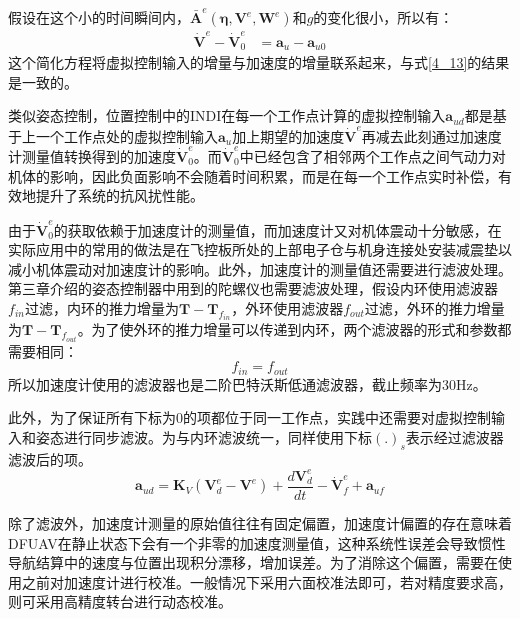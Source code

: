 假设在这个小的时间瞬间内，$\bar{\boldsymbol{A}}^e(\boldsymbol{\eta},\boldsymbol{V}^e,\boldsymbol{W}^e)$和$g$的变化很小，所以有：
\begin{equation}
    \begin{aligned}
        \dot{\boldsymbol{V}}^e - \dot{\boldsymbol{V}}^e_0&=\boldsymbol{a}_u - \boldsymbol{a}_{u0}
    \end{aligned}
    \label{4_20}
\end{equation}
这个简化方程将虚拟控制输入的增量与加速度的增量联系起来，与式\eqref{4_13}的结果是一致的。

类似姿态控制，位置控制中的INDI在每一个工作点计算的虚拟控制输入$\boldsymbol{a}_{ud}$都是基于上一个工作点处的虚拟控制输入$\boldsymbol{a}_{u}$加上期望的加速度$\boldsymbol{\dot{V}}^e$再减去此刻通过加速度计测量值转换得到的加速度$\boldsymbol{\dot{V}}^e_0$。而$\boldsymbol{\dot{V}}^e_0$中已经包含了相邻两个工作点之间气动力对机体的影响，因此负面影响不会随着时间积累，而是在每一个工作点实时补偿，有效地提升了系统的抗风扰性能。

由于$\dot{\boldsymbol{V}}^e_0$的获取依赖于加速度计的测量值，而加速度计又对机体震动十分敏感，在实际应用中的常用的做法是在飞控板所处的上部电子仓与机身连接处安装减震垫以减小机体震动对加速度计的影响。此外，加速度计的测量值还需要进行滤波处理。第三章介绍的姿态控制器中用到的陀螺仪也需要滤波处理，假设内环使用滤波器$f_{in}$过滤，内环的推力增量为$\boldsymbol{T}-\boldsymbol{T}_{f_{in}}$，外环使用滤波器$f_{out}$过滤，外环的推力增量为$\boldsymbol{T}-\boldsymbol{T}_{f_{out}}$。为了使外环的推力增量可以传递到内环，两个滤波器的形式和参数都需要相同\cite{smeurCascadedIncrementalNonlinear2018b}：
\begin{equation}
        f_{in}=f_{out}
    \label{4_21}
\end{equation}
所以加速度计使用的滤波器也是二阶巴特沃斯低通滤波器，截止频率为30Hz。

此外，为了保证所有下标为0的项都位于同一工作点，实践中还需要对虚拟控制输入和姿态进行同步滤波。为与内环滤波统一，同样使用下标$(.)_s$表示经过滤波器滤波后的项。
\begin{equation}
        \boldsymbol{a}_{ud}=\boldsymbol{K}_{V}(\boldsymbol{V}_d^e-\boldsymbol{V}^e)+\frac{d\boldsymbol{V}^e_d}{dt}-\boldsymbol{\dot{V}}^e_f+\boldsymbol{a}_{uf}
    \label{4_22}
\end{equation}

除了滤波外，加速度计测量的原始值往往有固定偏置，加速度计偏置的存在意味着DFUAV在静止状态下会有一个非零的加速度测量值，这种系统性误差会导致惯性导航结算中的速度与位置出现积分漂移，增加误差。为了消除这个偏置，需要在使用之前对加速度计进行校准。一般情况下采用六面校准法即可，若对精度要求高，则可采用高精度转台进行动态校准。


